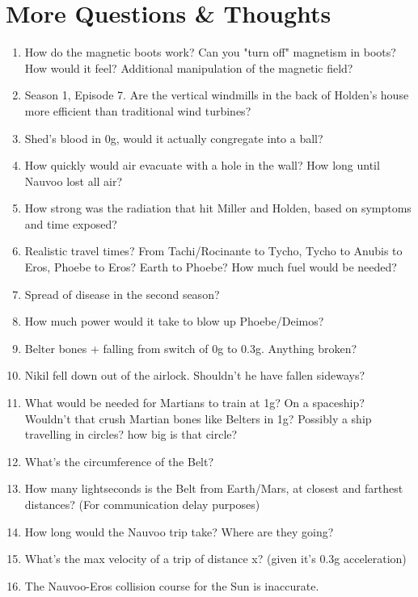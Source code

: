 \documentclass{amsart}
\theoremstyle{definition}
\begin{document}
\section{More Questions \& Thoughts}
\begin{enumerate}
    \item How do the magnetic boots work? Can you "turn off" magnetism in boots?
    \subitem How would it feel? Additional manipulation of the magnetic field?
    
    \item Season 1, Episode 7. Are the vertical windmills in the back of Holden's house more efficient than traditional wind turbines?
    
    \item Shed's blood in 0g, would it actually congregate into a ball?
    \item How quickly would air evacuate with a hole in the wall?
    \subitem How long until Nauvoo lost all air?
    \item How strong was the radiation that hit Miller and Holden, based on symptoms and time exposed?
    \item Realistic travel times? From Tachi/Rocinante to Tycho, Tycho to Anubis to Eros, Phoebe to Eros? Earth to Phoebe?
    \subitem How much fuel would be needed?
    \item Spread of disease in the second season?
    \item How much power would it take to blow up Phoebe/Deimos?
    \item Belter bones + falling from switch of 0g to 0.3g. Anything broken?
    \item Nikil fell down out of the airlock. Shouldn't he have fallen sideways?
    \item What would be needed for Martians to train at 1g? On a spaceship? Wouldn't that crush Martian bones like Belters in 1g?
    \subitem Possibly a ship travelling in circles? how big is that circle?
    \item What's the circumference of the Belt?
    \item How many lightseconds is the Belt from Earth/Mars, at closest and farthest distances? (For communication delay purposes)
    \item How long would the Nauvoo trip take? Where are they going?
    \item What's the max velocity of a trip of distance x? (given it's 0.3g acceleration)
    \item The Nauvoo-Eros collision course for the Sun is inaccurate.

\end{enumerate}
\end{document}
